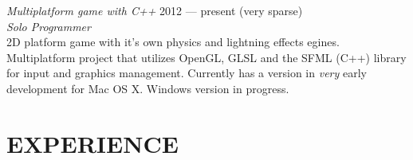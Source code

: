 \documentclass[]{res} %
\newcommand{\sbt}{\,\begin{picture}(-1,1)(-2,-3)\circle*{2}\end{picture}\ }
\def \divspace{6pt}
\def \myitemback{0.55cm}
\def \myitemsep{0pt}
\def \mypositionface{\sl}
\def \myprojectface{\it}
\def \myorgface{\sc}
\begin{document}
\begin{resume}

{\myprojectface Multiplatform game with C++} \hfill 2012 — present (very sparse) \\
{\mypositionface Solo Programmer} \\
2D platform game with it's own physics and lightning effects egines. Multiplatform project that utilizes OpenGL, GLSL and the SFML (C++) library for input and graphics management.
Currently has a version in {\it very} early development for Mac OS X. Windows version in progress.

\section{EXPERIENCE \hspace{\divspace} }





\end{resume}
\end{document}
